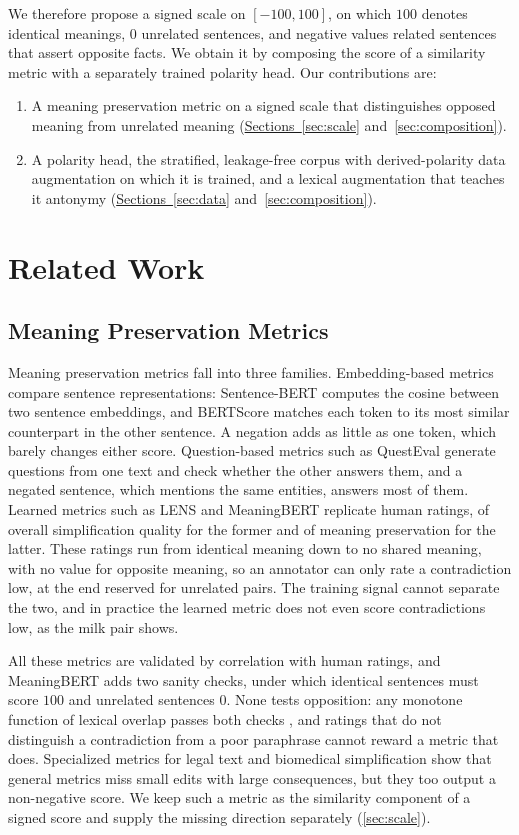 \documentclass[11pt]{article}
\newcommand{\autorefpair}[3]{\hyperref[#2]{#1~\ref*{#2}} and~\hyperref[#3]{\ref*{#3}}}
\begin{document}
We therefore propose a signed scale on $[-100, 100]$, on which $100$ denotes identical meanings, $0$ unrelated sentences, and negative values related sentences that assert opposite facts.
We obtain it by composing the score of a similarity metric with a separately trained polarity head.
Our contributions are:

\begin{enumerate}[nosep]
\item A meaning preservation metric on a signed scale that distinguishes opposed meaning from unrelated meaning (\autorefpair{Sections}{sec:scale}{sec:composition}).
\item A polarity head, the stratified, leakage-free corpus with derived-polarity data augmentation on which it is trained, and a lexical augmentation that teaches it antonymy (\autorefpair{Sections}{sec:data}{sec:composition}).
\end{enumerate}

\section{Related Work}
\label{sec:related}

\subsection{Meaning Preservation Metrics}

Meaning preservation metrics fall into three families.
Embedding-based metrics compare sentence representations: Sentence-BERT computes the cosine between two sentence embeddings, and BERTScore matches each token to its most similar counterpart in the other sentence.
A negation adds as little as one token, which barely changes either score.
Question-based metrics such as QuestEval generate questions from one text and check whether the other answers them, and a negated sentence, which mentions the same entities, answers most of them.
Learned metrics such as LENS and MeaningBERT replicate human ratings, of overall simplification quality for the former and of meaning preservation for the latter.
These ratings run from identical meaning down to no shared meaning, with no value for opposite meaning, so an annotator can only rate a contradiction low, at the end reserved for unrelated pairs.
The training signal cannot separate the two, and in practice the learned metric does not even score contradictions low, as the milk pair shows.

All these metrics are validated by correlation with human ratings, and MeaningBERT adds two sanity checks, under which identical sentences must score $100$ and unrelated sentences $0$.
None tests opposition: any monotone function of lexical overlap passes both checks \citep{baral2026lexflip}, and ratings that do not distinguish a contradiction from a poor paraphrase cannot reward a metric that does.
Specialized metrics for legal text \citep{beauchemin2025judgebert} and biomedical simplification \citep{lyu2024scigispy} show that general metrics miss small edits with large consequences, but they too output a non-negative score.
We keep such a metric as the similarity component of a signed score and supply the missing direction separately (\autoref{sec:scale}).
\end{document}
